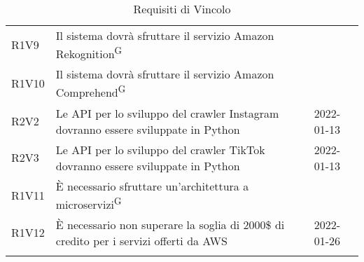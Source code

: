 \begin{longtable}{ m{}<{\centering}  m{}<{\centering}  m{}<{\centering}  m{}<{\centering}}
	R1V9 & Il sistema dovrà sfruttare il servizio Amazon Rekognition\textsuperscript{G} & \Ob & \Ca \\
		
	R1V10 & Il sistema dovrà sfruttare il servizio Amazon Comprehend\textsuperscript{G} & \Ob & \Ca \\	 

	R2V2 & Le API per lo sviluppo del crawler Instagram dovranno essere sviluppate in Python & \De & \Vi{} 2022-01-13 \\	
	 
	R2V3 & Le API per lo sviluppo del crawler TikTok dovranno essere sviluppate in Python & \De & \Vi{} 2022-01-13 \\	
	 
	R1V11 & È necessario sfruttare un’architettura a microservizi\textsuperscript{G}  & \Ob & \Ca \\	
	 
	R1V12 & È necessario non superare la soglia di 2000\$ di credito per i servizi offerti da AWS & \Ob & \Ve{} 2022-01-26 \\	
	
	\hiderowcolors \caption{Requisiti di Vincolo}
\end{longtable}

\pagebreak